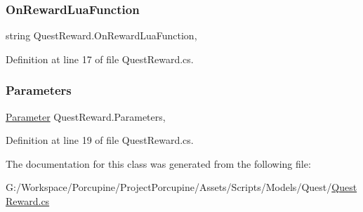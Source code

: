 \subsubsection{\texorpdfstring{On\+Reward\+Lua\+Function}{OnRewardLuaFunction}}
{\footnotesize\ttfamily string Quest\+Reward.\+On\+Reward\+Lua\+Function\hspace{0.3cm}{\ttfamily [get]}, {\ttfamily [set]}}



Definition at line 17 of file Quest\+Reward.\+cs.

\mbox{\label{class_quest_reward_ae4f3170c2c953a87d82f8d44f15de75c}} 
\subsubsection{\texorpdfstring{Parameters}{Parameters}}
{\footnotesize\ttfamily \hyperlink{class_parameter}{Parameter} Quest\+Reward.\+Parameters\hspace{0.3cm}{\ttfamily [get]}, {\ttfamily [set]}}



Definition at line 19 of file Quest\+Reward.\+cs.



The documentation for this class was generated from the following file\+:\begin{DoxyCompactItemize}
\item 
G\+:/\+Workspace/\+Porcupine/\+Project\+Porcupine/\+Assets/\+Scripts/\+Models/\+Quest/\hyperlink{_quest_reward_8cs}{Quest\+Reward.\+cs}\end{DoxyCompactItemize}

